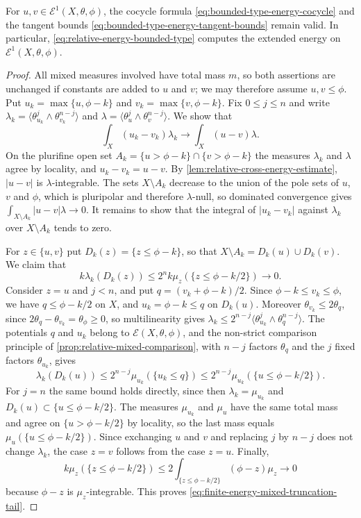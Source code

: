 \begin{proposition}\label{prop:relative-finite-energy-cocycle}
For $u,v\in\mathcal E^1(X,\theta,\phi)$, the cocycle formula \eqref{eq:bounded-type-energy-cocycle} and the tangent bounds \eqref{eq:bounded-type-energy-tangent-bounds} remain valid. In particular, \eqref{eq:relative-energy-bounded-type} computes the extended energy on $\mathcal E^1(X,\theta,\phi)$.
\end{proposition}
\begin{proof}
All mixed measures involved have total mass $m$, so both assertions are unchanged if constants are added to $u$ and $v$; we may therefore assume $u,v\leq\phi$. Put $u_k=\max\{u,\phi-k\}$ and $v_k=\max\{v,\phi-k\}$. Fix $0\leq j\leq n$ and write $\lambda_k=\langle\theta_{u_k}^j\wedge\theta_{v_k}^{n-j}\rangle$ and $\lambda=\langle\theta_u^j\wedge\theta_v^{n-j}\rangle$. We show that
\begin{equation}\label{eq:finite-energy-cocycle-term-limit}
 \int_X(u_k-v_k)\lambda_k\longrightarrow\int_X(u-v)\lambda.
\end{equation}
On the plurifine open set $A_k=\{u>\phi-k\}\cap\{v>\phi-k\}$ the measures $\lambda_k$ and $\lambda$ agree by locality, and $u_k-v_k=u-v$. By \cref{lem:relative-cross-energy-estimate}, $|u-v|$ is $\lambda$-integrable. The sets $X\setminus A_k$ decrease to the union of the pole sets of $u$, $v$ and $\phi$, which is pluripolar and therefore $\lambda$-null, so dominated convergence gives $\int_{X\setminus A_k}|u-v|\lambda\to0$. It remains to show that the integral of $|u_k-v_k|$ against $\lambda_k$ over $X\setminus A_k$ tends to zero.

For $z\in\{u,v\}$ put $D_k(z)=\{z\leq\phi-k\}$, so that $X\setminus A_k=D_k(u)\cup D_k(v)$. We claim that
\begin{equation}\label{eq:finite-energy-mixed-truncation-tail}
 k\lambda_k(D_k(z))\leq
                         2^n k\mu_z(\{z\leq\phi-k/2\})\longrightarrow0.
\end{equation}
Consider $z=u$ and $j<n$, and put $q=(v_k+\phi-k)/2$. Since $\phi-k\leq v_k\leq\phi$, we have $q\leq\phi-k/2$ on $X$, and $u_k=\phi-k\leq q$ on $D_k(u)$. Moreover $\theta_{v_k}\leq2\theta_q$, since $2\theta_q-\theta_{v_k}=\theta_\phi\geq0$, so multilinearity gives $\lambda_k\leq2^{n-j}\langle\theta_{u_k}^j\wedge\theta_q^{n-j}\rangle$. The potentials $q$ and $u_k$ belong to $\mathcal E(X,\theta,\phi)$, and the non-strict comparison principle of \cref{prop:relative-mixed-comparison}, with $n-j$ factors $\theta_q$ and the $j$ fixed factors $\theta_{u_k}$, gives
\[
 \lambda_k(D_k(u))
   \leq2^{n-j}\mu_{u_k}(\{u_k\leq q\})
   \leq2^{n-j}\mu_{u_k}(\{u\leq\phi-k/2\}).
\]
For $j=n$ the same bound holds directly, since then $\lambda_k=\mu_{u_k}$ and $D_k(u)\subset\{u\leq\phi-k/2\}$. The measures $\mu_{u_k}$ and $\mu_u$ have the same total mass and agree on $\{u>\phi-k/2\}$ by locality, so the last mass equals $\mu_u(\{u\leq\phi-k/2\})$. Since exchanging $u$ and $v$ and replacing $j$ by $n-j$ does not change $\lambda_k$, the case $z=v$ follows from the case $z=u$. Finally,
\[
 k\mu_z(\{z\leq\phi-k/2\})\leq2\int_{\{z\leq\phi-k/2\}}(\phi-z)\mu_z\longrightarrow0
\]
because $\phi-z$ is $\mu_z$-integrable. This proves \eqref{eq:finite-energy-mixed-truncation-tail}.


\end{proof}
